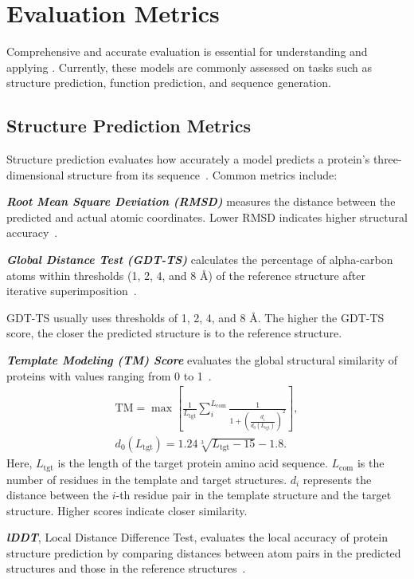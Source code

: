 \section{Evaluation Metrics}
\label{sec:app_eval}
Comprehensive and accurate evaluation is essential for understanding and applying \proteinllms. Currently, these models are commonly assessed on tasks such as structure prediction, function prediction, and sequence generation.

\subsection{Structure Prediction Metrics}
Structure prediction evaluates how accurately a model predicts a protein’s three-dimensional structure from its sequence~\cite{kuhlman2019advances}. Common metrics include:

\smallskip\noindent \textit{\textbf{Root Mean Square Deviation (RMSD)}} measures the distance between the predicted and actual atomic coordinates. Lower RMSD indicates higher structural accuracy~\cite{li2013difficulty}.


\smallskip\noindent \textit{\textbf{Global Distance Test (GDT-TS)}} calculates the percentage of alpha-carbon atoms within thresholds (1, 2, 4, and 8 \r{A}) of the reference structure after iterative superimposition~\cite{zemla2003lga}.

GDT-TS usually uses thresholds of 1, 2, 4, and 8 \r{A}. The higher the GDT-TS score, the closer the predicted structure is to the reference structure.


\smallskip\noindent \textit{\textbf{Template Modeling (TM) Score}} evaluates the global structural similarity of proteins with values ranging from 0 to 1~\cite{zhang2004scoring}. 
\begin{gather}
\text{TM}=\max \left[ \frac{1}{L_{\text{tgt}}} \sum_{i}^{L_{\text{com}}} \frac{1}{1+\left( \frac{d_{i}}{\scriptscriptstyle d_{0}(L_{\text{tgt}})} \right)^{2}} \right], \\
d_0(L_{\text{tgt}}) = 1.24 \sqrt[3]{L_{\text{tgt}} - 15} - 1.8.
\end{gather}
Here, $L_{\text{tgt}}$ is the length of the target protein amino acid sequence. $L_{\text{com}}$ is the number of residues in the template and target structures. $d_i$ represents the distance between the $i$-th residue pair in the template structure and the target structure. Higher scores indicate closer similarity. 

\smallskip\noindent \textit{\textbf{lDDT}}, Local Distance Difference Test, evaluates the local accuracy of protein structure prediction by comparing distances between atom pairs in the predicted structures and those in the reference structures~\cite{mariani2013lddt}.

